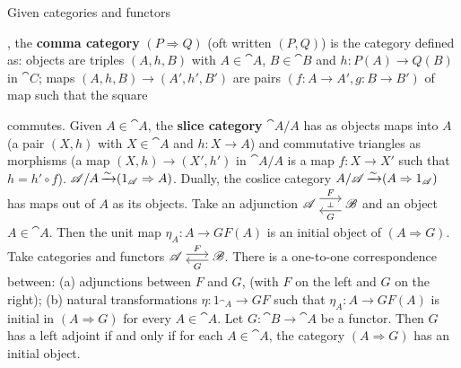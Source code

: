  Given categories and functors 
, the \textbf{comma category} $(P \Rightarrow Q)$ (oft written $(P \comma Q)$) is the category defined as: objects are triples $(A, h, B)$ with $A \in \cat A$, $B \in \cat B$ and $h : P(A) \to Q(B)$ in $\cat C$; maps $(A,h,B) \to (A',h',B')$ are pairs $(f: A \to A', g: B \to B')$ of map such that the square 
 commutes.
 Given $A \in \cat{A}$, the \textbf{slice category} $\cat{A}/A$ has as objects maps into $A$ (a pair $(X, h)$ with $X \in \cat{A}$ and $h : X \to A$) and commutative triangles as morphisms (a map $(X, h) \to (X', h')$ in $\cat{A}/A$ is a map $f : X \to X'$ such that $h = h' \circ f$). $\mathscr{A}/A \operatorname{\xrightarrow[]{\sim}} (1_{\mathscr{A}} \Rightarrow A)$. Dually, the coslice category $A/\mathscr{A} \operatorname{\xrightarrow[]{\sim}} (A \Rightarrow 1_{\mathscr{A}})$ has maps out of $A$ as its objects.
 Take an adjunction $\cat{A} \ladj{F}{G} \cat B$  and an object $A \in \cat A$. Then the unit map $\eta_A : A \to GF(A)$ is an initial object of $(A \Rightarrow G)$.
 Take categories and functors $\cat A \isofuncs{F}{G} \cat B$. There is a one-to-one correspondence between: (a) adjunctions between $F$ and $G$, (with $F$ on the left and $G$ on the right); (b) natural transformations $\eta : 1_{\cat{A}} \to GF$ such that $\eta_A : A \to GF(A)$ is initial in $(A \Rightarrow G)$ for every $A \in \cat{A}$.
 Let $G: \cat{B} \to \cat{A}$ be a functor. Then $G$ has a left adjoint if and only if for each $A \in \cat{A}$, the  category $(A \Rightarrow G)$ has an initial object.
